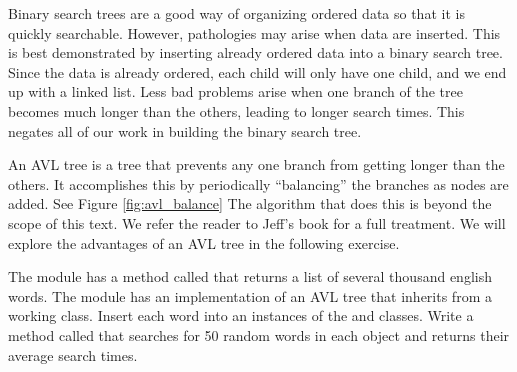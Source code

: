 Binary search trees are a good way of organizing ordered data so that it is quickly searchable.
However, pathologies may arise when data are inserted.
This is best demonstrated by inserting already ordered data into a binary search tree.
Since the data is already ordered, each child will only have one child, and we end up with a linked list.
Less bad problems arise when one branch of the tree becomes much longer than the others, leading to longer search times.
This negates all of our work in building the binary search tree.

An AVL tree is a tree that prevents any one branch from getting longer than the others.
It accomplishes this by periodically ``balancing'' the branches as nodes are added.
See Figure \ref{fig:avl_balance}
The algorithm that does this is beyond the scope of this text.
We refer the reader to Jeff's book for a full treatment.
We will explore the advantages of an AVL tree in the following exercise.

\begin{problem}
The  module has a method called  that returns a list of several thousand english words.
The  module has an implementation of an AVL tree that inherits from a working  class.
Insert each word into an instances of the  and  classes.
Write a method called  that searches for 50 random words in each object and returns their average search times.
\end{problem}

